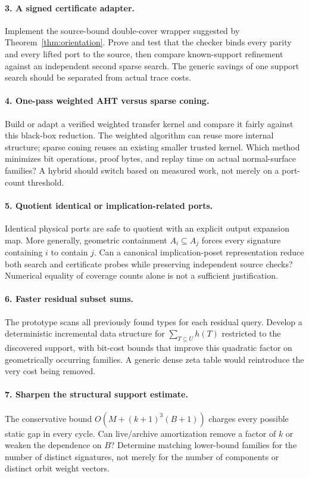 \documentclass[11pt]{article}
\theoremstyle{definition}
\begin{document}
\paragraph{3. A signed certificate adapter.}
Implement the source-bound double-cover wrapper suggested by
Theorem~\ref{thm:orientation}. Prove and test that the checker binds every
parity and every lifted port to the source, then compare known-support
refinement against an independent second sparse search. The generic
savings of one support search should be separated from actual trace costs.

\paragraph{4. One-pass weighted AHT versus sparse coning.}
Build or adapt a verified weighted transfer kernel and compare it fairly
against this black-box reduction. The weighted algorithm can reuse more
internal structure; sparse coning reuses an existing smaller trusted kernel.
Which method minimizes bit operations, proof bytes, and replay time on
actual normal-surface families? A hybrid should switch based on measured
work, not merely on a port-count threshold.

\paragraph{5. Quotient identical or implication-related ports.}
Identical physical ports are safe to quotient with an explicit output
expansion map. More generally, geometric containment $A_i\subseteq A_j$
forces every signature containing $i$ to contain $j$. Can a canonical
implication-poset representation reduce both search and certificate probes
while preserving independent source checks? Numerical equality of coverage
counts alone is not a sufficient justification.

\paragraph{6. Faster residual subset sums.}
The prototype scans all previously found types for each residual query.
Develop a deterministic incremental data structure for
$\sum_{T\subseteq U}h(T)$ restricted to the discovered support, with bit-cost
bounds that improve this quadratic factor on geometrically occurring
families. A generic dense zeta table would reintroduce the very cost being
removed.

\paragraph{7. Sharpen the structural support estimate.}
The conservative bound $O(M+(k+1)^3(B+1))$ charges every possible static
gap in every cycle. Can live/archive amortization remove a factor of $k$
or weaken the dependence on $B$? Determine matching lower-bound families
for the number of distinct signatures, not merely for the number of
components or distinct orbit weight vectors.
\end{document}
